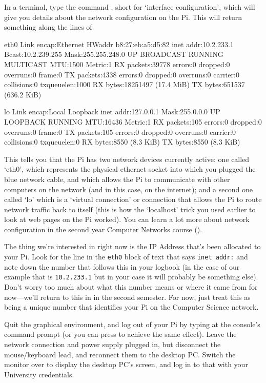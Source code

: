 In a terminal, type the command , short for `interface configuration', which will give you details about the network configuration on the Pi. This will return something along the lines of

\begin{ttoutenv}
eth0      Link encap:Ethernet  HWaddr b8:27:eb:a5:d5:82
          inet addr:10.2.233.1  Bcast:10.2.239.255  Mask:255.255.248.0
          UP BROADCAST RUNNING MULTICAST  MTU:1500  Metric:1
          RX packets:39778 errors:0 dropped:0 overruns:0 frame:0
          TX packets:4338 errors:0 dropped:0 overruns:0 carrier:0
          collisions:0 txqueuelen:1000
          RX bytes:18251497 (17.4 MiB)  TX bytes:651537 (636.2 KiB)

lo        Link encap:Local Loopback
          inet addr:127.0.0.1  Mask:255.0.0.0
          UP LOOPBACK RUNNING  MTU:16436  Metric:1
          RX packets:105 errors:0 dropped:0 overruns:0 frame:0
          TX packets:105 errors:0 dropped:0 overruns:0 carrier:0
          collisions:0 txqueuelen:0
          RX bytes:8550 (8.3 KiB)  TX bytes:8550 (8.3 KiB)
\end{ttoutenv}

This tells you that the Pi has two network devices currently active: one called `eth0', which represents the physical ethernet socket into which you plugged the blue network cable, and which allows the Pi to communicate with other computers on the network (and in this case, on the internet); and a second one called `lo' which is a `virtual connection' or  connection that allows the Pi to route network traffic back to itself (this is how the `localhost' trick you used earlier to look at web pages on the Pi worked). You can learn a lot more about network configuration in the second year Computer Networks course (). 

The thing we're interested in right now is the IP Address that's been allocated to your Pi. Look for the line in the \texttt{eth0} block of text that says \texttt{inet addr:} and note down the number that follows this in your logbook (in the case of our example that is \texttt{10.2.233.1} but in your case it will probably be something else). Don't worry too much about what this number means or where it came from for now---we'll return to this in  in the second semester. For now, just treat this as being a unique number that identifies your Pi on the Computer Science network. 

Quit the graphical environment, and log out of your Pi by typing  at the console's command prompt (or you can press  to achieve the same effect). Leave the network connection and power supply plugged in, but disconnect the mouse/keyboard lead, and reconnect them to the desktop PC. Switch the monitor over to display the desktop PC's screen, and log in to that with your University credentials. 

